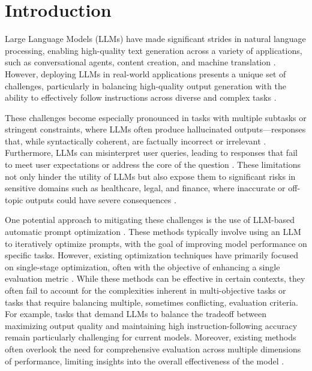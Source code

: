 \section{Introduction} \label{sec:1}

Large Language Models (LLMs) have made significant strides in natural language processing, enabling high-quality text generation across a variety of applications, such as conversational agents, content creation, and machine translation \citep{wei2022emergent}. However, deploying LLMs in real-world applications presents a unique set of challenges, particularly in balancing high-quality output generation with the ability to effectively follow instructions across diverse and complex tasks \citep{wang2023large, chang2024survey}.

These challenges become especially pronounced in tasks with multiple subtasks or stringent constraints, where LLMs often produce hallucinated outputs—responses that, while syntactically coherent, are factually incorrect or irrelevant \citep{ji2023survey, bang2023multitask}. Furthermore, LLMs can misinterpret user queries, leading to responses that fail to meet user expectations or address the core of the question \citep{kulkarni2024crafting}. These limitations not only hinder the utility of LLMs but also expose them to significant risks in sensitive domains such as healthcare, legal, and finance, where inaccurate or off-topic outputs could have severe consequences \citep{nori2023capabilities}.

One potential approach to mitigating these challenges is the use of LLM-based automatic prompt optimization \citep{zhou2023large, pryzant2023automatic}. These methods typically involve using an LLM to iteratively optimize prompts, with the goal of improving model performance on specific tasks. However, existing optimization techniques have primarily focused on single-stage optimization, often with the objective of enhancing a single evaluation metric \citep{yang2024largelanguagemodelsoptimizers, sun2023autohint}. While these methods can be effective in certain contexts, they often fail to account for the complexities inherent in multi-objective tasks or tasks that require balancing multiple, sometimes conflicting, evaluation criteria. For example, tasks that demand LLMs to balance the tradeoff between maximizing output quality and maintaining high instruction-following accuracy remain particularly challenging for current models. Moreover, existing methods often overlook the need for comprehensive evaluation across multiple dimensions of performance, limiting insights into the overall effectiveness of the model \citep{chen2024multi}.

